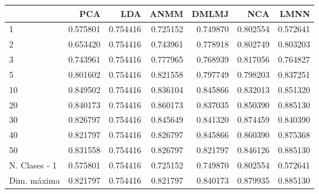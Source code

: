 \begin{tabular}{lrrrrrr}
\toprule
{} &       PCA &       LDA &      ANMM &     DMLMJ &       NCA &      LMNN \\
\midrule
1             &  0.575801 &  0.754416 &  0.725152 &  0.749870 &  0.802554 &  0.572641 \\
2             &  0.653420 &  0.754416 &  0.743961 &  0.778918 &  0.802749 &  0.803203 \\
3             &  0.743961 &  0.754416 &  0.777965 &  0.768939 &  0.817056 &  0.764827 \\
5             &  0.801602 &  0.754416 &  0.821558 &  0.797749 &  0.798203 &  0.837251 \\
10            &  0.849502 &  0.754416 &  0.836104 &  0.845866 &  0.832013 &  0.851320 \\
20            &  0.840173 &  0.754416 &  0.860173 &  0.837035 &  0.850390 &  0.885130 \\
30            &  0.826797 &  0.754416 &  0.845649 &  0.841320 &  0.874459 &  0.840390 \\
40            &  0.821797 &  0.754416 &  0.826797 &  0.845866 &  0.860390 &  0.875368 \\
50            &  0.831558 &  0.754416 &  0.826797 &  0.821797 &  0.846126 &  0.885130 \\
N. Clases - 1 &  0.575801 &  0.754416 &  0.725152 &  0.749870 &  0.802554 &  0.572641 \\
Dim. máxima   &  0.821797 &  0.754416 &  0.821797 &  0.840173 &  0.879935 &  0.885130 \\
\bottomrule
\end{tabular}
